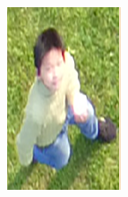 \begin{figure}[h]
    \centering
    \begin{subfigure}[h]{0.11\textwidth}
        \includegraphics[width=\textwidth]{figures/样本标注示例1.png}
    \end{subfigure}
    ~ %
    \begin{subfigure}[h]{0.11\textwidth}

\end{subfigure}
\end{figure}
